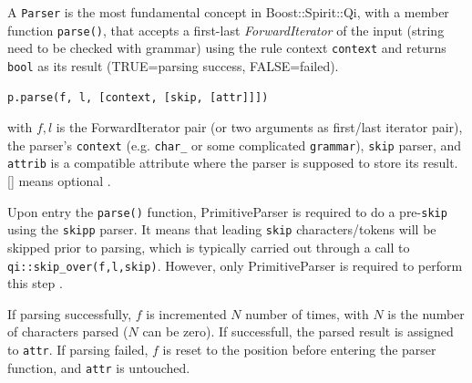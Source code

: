 \begin{mdframed}
A \verb!Parser! is the most fundamental concept in Boost::Spirit::Qi, with a
member function \verb!parse()!, that accepts a first-last {\it ForwardIterator}
 of the input (string need to be checked with
grammar) using the rule context \verb!context! and returns \verb!bool! as its
result (TRUE=parsing success, FALSE=failed).
\begin{verbatim}
p.parse(f, l, [context, [skip, [attr]]])
\end{verbatim}
with $f,l$ is the ForwardIterator pair (or two arguments as first/last iterator
pair), the parser's \verb!context! (e.g.
\verb!char_! or some complicated \verb!grammar!), \verb!skip! parser, and
\verb!attrib! is a compatible attribute where the parser is supposed to store
its result. [] means optional \footnotemark[2].

Upon entry the \verb!parse()! function, PrimitiveParser is required to do a
pre-\verb!skip! using the \verb!skipp! parser. It means that leading \verb!skip!
characters/tokens will be skipped prior to parsing, which is typically carried
out through a call to \verb!qi::skip_over(f,l,skip)!. However, only
PrimitiveParser is required to perform this step \footnotemark[3].

If parsing successfully, $f$ is incremented $N$ number of times, with $N$ is the
number of characters parsed ($N$ can be zero). If successfull, the parsed result
is assigned to \verb!attr!. If parsing failed, $f$ is reset to the position
before entering the parser function, and \verb!attr! is untouched.
\end{mdframed}



